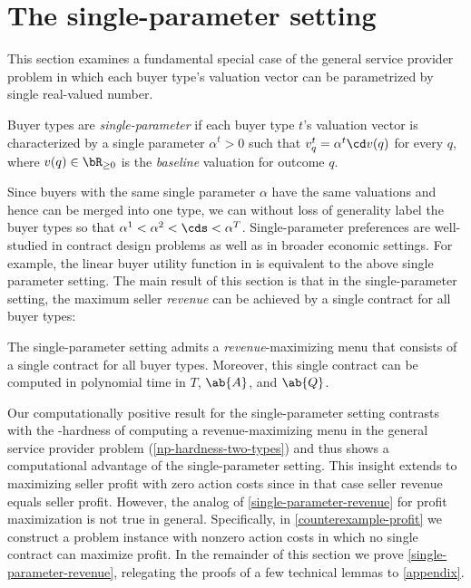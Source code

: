 \section{The single-parameter setting} \label{single-parameter}

This section examines a fundamental special case of the general service provider problem in which each buyer type's valuation vector can be parametrized by single real-valued number. %

\begin{definition*} \label{single-parameter-definition}
 Buyer types are \emph{single-parameter} if each buyer type $t$'s valuation vector is characterized by a single parameter $\alpha^t>0$  such that $v^t_q = \alpha^t \cd v(q)$ for every $q$, where $v(q) \in \bR_{\ge 0}$ is the \emph{baseline} valuation for outcome $q$. 
 \end{definition*}


Since buyers with the same single parameter $\alpha$ have the same valuations and hence can be merged into one type, we can without loss of generality label the buyer types so that $\alpha^1 < \alpha^2 < \cds < \alpha^T$. Single-parameter preferences are well-studied in contract design problems \citep{alon2021contracts,li2022selling,chen2015complexity} as well as in broader economic settings. For example, the linear buyer utility function in \citet{mussa1978monopoly} is equivalent to the above single parameter setting. The main result of this section is that in the single-parameter setting, the maximum seller \emph{revenue} can be achieved by a single contract for all buyer types:

\begin{theorem} \label{single-parameter-revenue}
    The single-parameter setting admits a \emph{revenue}-maximizing menu that consists of a single contract for all buyer types. Moreover, this single contract can be computed in polynomial time in $T$,  $\ab{A}$, and $\ab{Q}$.
\end{theorem}

Our computationally positive result for the single-parameter setting contrasts with the -hardness of computing a revenue-maximizing menu in the general service provider problem (\cref{np-hardness-two-types}) and thus shows a computational advantage of the single-parameter setting. This insight extends to maximizing seller profit with zero action costs since in that case seller revenue equals seller profit. However, the analog of \cref{single-parameter-revenue} for profit maximization is not true in general. Specifically, in \cref{counterexample-profit}  we construct a problem
instance with nonzero action costs in which no single contract can maximize profit.  In the remainder of this section we prove \cref{single-parameter-revenue}, relegating the proofs of a few technical lemmas to \cref{appendix}.

